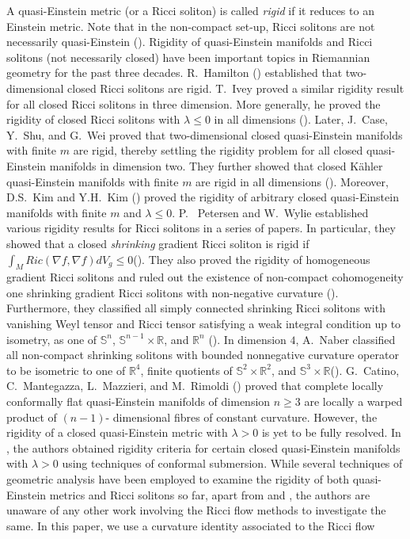 \documentclass[12pt]{amsart}
\theoremstyle{definition}
\numberwithin{equation}{section}
\begin{document}
A quasi-Einstein metric (or a Ricci soliton) is called \textit{rigid} if it reduces to an Einstein metric. Note that in the non-compact set-up, Ricci solitons are not necessarily quasi-Einstein (\cite{NCRS}). Rigidity of quasi-Einstein manifolds and Ricci solitons (not necessarily closed) have been important topics in Riemannian geometry for the past three decades. R.~Hamilton (\cite{RHS}) established that two-dimensional closed Ricci solitons are rigid. T.~Ivey proved a similar rigidity result for all closed Ricci solitons in three dimension.  More generally, he proved the rigidity of closed Ricci solitons with $\lambda \leq 0$ in all dimensions (\cite{RSTV}). Later, J.~Case, Y.~Shu, and G.~Wei proved that two-dimensional closed quasi-Einstein manifolds with finite $m$ are rigid, thereby settling the rigidity problem for all closed quasi-Einstein manifolds in dimension two. They further showed that closed K\"ahler quasi-Einstein manifolds with finite $m$ are rigid in all dimensions (\cite{RQE}). Moreover, D.S.~Kim and Y.H.~Kim (\cite{KKWP}) proved the rigidity of arbitrary closed quasi-Einstein manifolds with finite $m$ and $\lambda \leq 0$. P.~ Petersen and W.~Wylie established various rigidity results for Ricci solitons in a series of papers. In particular, they showed that a closed \textit{shrinking} gradient Ricci soliton is rigid if $\int_{M}Ric(\nabla f, \nabla f) dV_{g} \leq 0$(\cite{PWRGRS}). They also proved the rigidity of homogeneous gradient Ricci solitons and ruled out the existence of non-compact cohomogeneity one shrinking gradient Ricci solitons with non-negative curvature (\cite{PWGRSS}). Furthermore, they classified all simply connected shrinking Ricci solitons with vanishing Weyl tensor and Ricci tensor satisfying a weak integral condition up to isometry, as one of $\mathbb{S}^{n}$, $\mathbb{S}^{n-1} \times \mathbb{R}$, and $\mathbb{R}^{n}$ (\cite{CGSPW}). In dimension $4$, A.~Naber classified all non-compact shrinking solitons with bounded nonnegative curvature operator to be isometric to one of $\mathbb{R}^{4}$, finite quotients of $\mathbb{S}^{2} \times \mathbb{R}^{2}$, and $\mathbb{S}^{3} \times \mathbb{R}$(\cite{RSAN}). G.~Catino, C.~Mantegazza, L.~Mazzieri, and M.~Rimoldi (\cite{LCFQEM}) proved that complete locally conformally flat quasi-Einstein manifolds of dimension $n \geq 3$ are locally a warped product of $(n-1)$- dimensional fibres of constant curvature. However, the rigidity of a closed quasi-Einstein metric with $\lambda>0$ is yet to be fully resolved. In \cite{ABSP}, the authors obtained rigidity criteria for certain closed quasi-Einstein manifolds with $\lambda >0$ using techniques of conformal submersion. While several techniques of geometric analysis have been employed to examine the rigidity of both quasi-Einstein metrics and Ricci solitons so far, apart from \cite{RHS} and \cite{RSTV}, the authors are unaware of any other work involving the Ricci flow methods to investigate the same. In this paper, we use a curvature identity associated to the Ricci flow 
\end{document}
